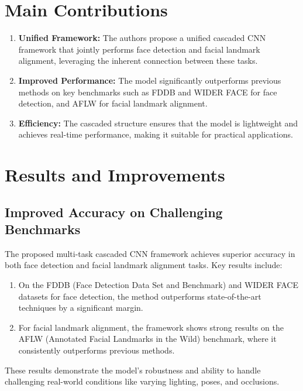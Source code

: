 \documentclass{report}
\begin{document}
	\section{Main Contributions}
	\begin{enumerate}
		\item 
		\textbf{Unified Framework:} The authors propose a unified cascaded CNN framework that jointly performs face detection and facial landmark alignment, leveraging the inherent connection between these tasks.
		
		\item 
		\textbf{Improved Performance:} The model significantly outperforms previous methods on key benchmarks such as FDDB and WIDER FACE for face detection, and AFLW for facial landmark alignment.
		
		\item 
		\textbf{Efficiency:} The cascaded structure ensures that the model is lightweight and achieves real-time performance, making it suitable for practical applications.
	\end{enumerate}
	
	
	
	
	\section{Results and Improvements}
	\subsection{Improved Accuracy on Challenging Benchmarks}
	The proposed multi-task cascaded CNN framework achieves superior accuracy in both face detection and facial landmark alignment tasks. Key results include:
	
	\begin{enumerate}
		\item 
		On the FDDB (Face Detection Data Set and Benchmark) and WIDER FACE datasets for face detection, the method outperforms state-of-the-art techniques by a significant margin.
		
		\item 
		For facial landmark alignment, the framework shows strong results on the AFLW (Annotated Facial Landmarks in the Wild) benchmark, where it consistently outperforms previous methods.
	\end{enumerate}
	These results demonstrate the model's robustness and ability to handle challenging real-world conditions like varying lighting, poses, and occlusions.
	
\end{document}
